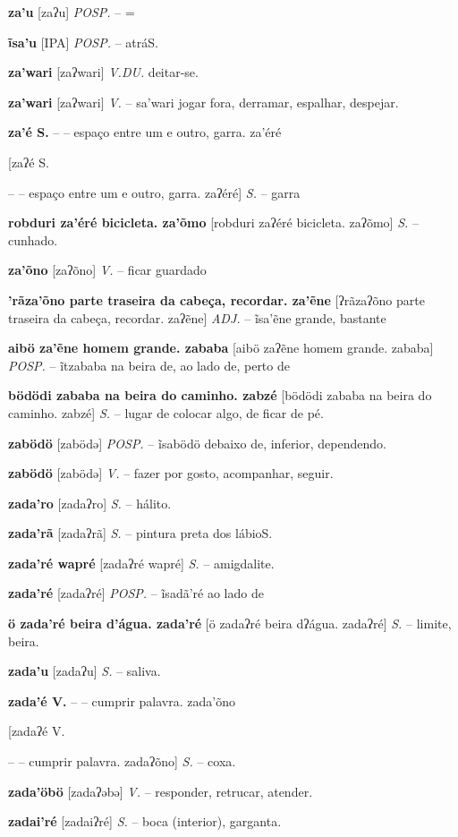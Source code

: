 {{{{{{{{{{{{\textbf{za'u} [zaʔu] \textit{POSP.} -- =

\textbf{ĩsa'u} [IPA] \textit{POSP.} -- atráS.}

\textbf{za'wari} [zaʔwari] \textit{V.DU.} deitar-se.

\textbf{za'wari} [zaʔwari] \textit{V.} -- sa'wari jogar fora, derramar, espalhar, despejar.

\textbf{za'é S.} -- -- espaço entre um e outro, garra. za'éré} [zaʔé S.} -- -- espaço entre um e outro, garra. zaʔéré] \textit{S.} -- garra

\textbf{robduri za'éré bicicleta. za'õmo} [robduri zaʔéré bicicleta. zaʔõmo] \textit{S.} -- cunhado.

\textbf{za'õno} [zaʔõno] \textit{V.} -- ficar guardado

\textbf{'rãza'õno parte traseira da cabeça, recordar. za'ẽne} [ʔrãzaʔõno parte traseira da cabeça, recordar. zaʔẽne] \textit{ADJ.} -- ĩsa'ẽne grande, bastante

\textbf{aibö za'ẽne homem grande. zababa} [aibö zaʔẽne homem grande. zababa] \textit{POSP.} -- ĩtzababa na beira de, ao lado de, perto de

\textbf{bödödi zababa na beira do caminho. zabzé} [bödödi zababa na beira do caminho. zabzé] \textit{S.} -- lugar de colocar algo, de ficar de pé.

\textbf{zabödö} [zabödə] \textit{POSP.} -- ĩsabödö debaixo de, inferior, dependendo.

\textbf{zabödö} [zabödə] \textit{V.} -- fazer por gosto, acompanhar, seguir.

\textbf{zada'ro} [zadaʔro] \textit{S.} -- hálito.

\textbf{zada'rã} [zadaʔrã] \textit{S.} -- pintura preta dos lábioS.}

\textbf{zada'ré wapré} [zadaʔré wapré] \textit{S.} -- amigdalite.

\textbf{zada'ré} [zadaʔré] \textit{POSP.} -- ĩsadã'ré ao lado de

\textbf{ö zada'ré beira d'água. zada'ré} [ö zadaʔré beira dʔágua. zadaʔré] \textit{S.} -- limite, beira.

\textbf{zada'u} [zadaʔu] \textit{S.} -- saliva.

\textbf{zada'é V.} -- -- cumprir palavra. zada'õno} [zadaʔé V.} -- -- cumprir palavra. zadaʔõno] \textit{S.} -- coxa.

\textbf{zada'öbö} [zadaʔəbə] \textit{V.} -- responder, retrucar, atender.

\textbf{zadai'ré} [zadaiʔré] \textit{S.} -- boca (interior), garganta.

}}}}}}
